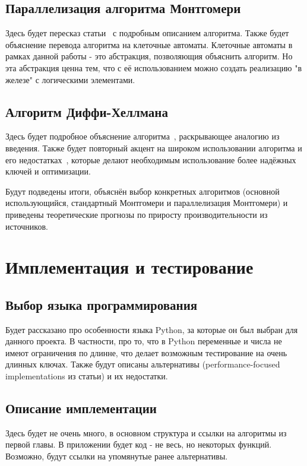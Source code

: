 \documentclass[times,specification,annotation]{itmo-student-thesis}
\begin{document}
\section{Параллелизация алгоритма Монтгомери}\label{sec:paramont}

Здесь будет пересказ статьи~\cite{ku04} с подробным описанием алгоритма.
Также будет объяснение перевода алгоритма на клеточные автоматы.
Клеточные автоматы в рамках данной работы - это абстракция, позволяющия объяснить алгоритм.
Но эта абстракция ценна тем, что с её использованием можно создать реализацию "в железе" с логическими элементами.
\section{Алгоритм Диффи-Хеллмана}\label{sec:dhke}

Здесь будет подробное объяснение алгоритма~\cite{dif77}, раскрывающее аналогию из введения.
Также будет повторный акцент на широком использовании алгоритма и его недостатках~\cite{adr15},
которые делают необходимым использование более надёжных ключей и оптимизации.
\chapterconclusion

Будут подведены итоги, объяснён выбор конкретных алгоритмов (основной использующийся, стандартный
Монтгомери и параллелизация Монтгомери) и приведены теоретические прогнозы по приросту производительности
из источников.

\chapter{Имплементация и тестирование}

\section{Выбор языка программирования}\label{sec:prog}

Будет рассказано про особенности языка Python, за которые он был выбран для данного проекта.
В частности, про то, что в Python переменные и числа не имеют ограничения по длинне, что делает
возможным тестирование на очень длинных ключах.
Также будут описаны альтернативы (performance-focused implementations из статьи) и их недостатки.

\section{Описание имплементации}\label{sec:impl}

Здесь будет не очень много, в основном структура и ссылки на алгоритмы из первой главы.
В приложении будет код - не весь, но некоторых функций.
Возможно, будут ссылки на упомянутые ранее альтернативы.
\end{document}
